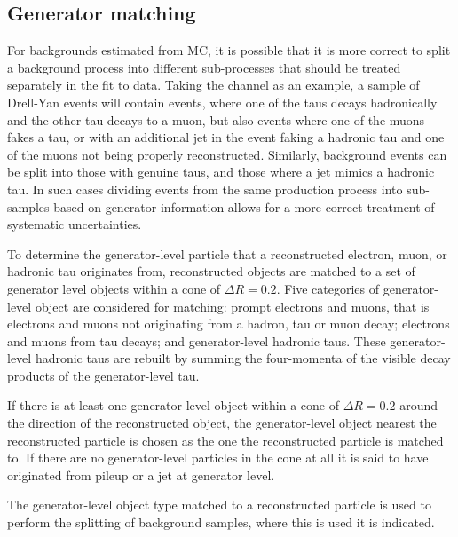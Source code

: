 \subsection{Generator matching}
\label{sec:mssm_bkgs_genmatch}
For backgrounds estimated from \ac{MC}, it is possible
that it is more correct to split a background process
into different sub-processes that should be treated separately in the fit to data.
Taking the \mutau 
channel as an example, a sample of Drell-Yan events
will contain \Ztautau events, where one of the taus decays
hadronically and the other tau decays to a muon, but also
\Zmm events where one of the muons fakes a tau, or with an 
additional jet in the event faking a hadronic tau and one of the
muons not being properly reconstructed. Similarly, \ttbar background
events can be split into those with genuine taus, and those
where a jet mimics a hadronic tau. In such cases dividing
events from the same production process into sub-samples
based on generator information allows for a more correct
treatment of systematic uncertainties.

To determine the generator-level particle
that a reconstructed electron, muon, or hadronic tau
originates from, reconstructed objects are matched
to a set of generator level objects within a cone of $\Delta R = 0.2$.
Five categories of generator-level object are considered for matching:
prompt electrons and muons,
that is electrons and muons not originating from a hadron, tau or muon decay; electrons and muons
from tau decays; and generator-level hadronic taus. These generator-level
hadronic taus are rebuilt by summing the four-momenta
of the visible decay products of the generator-level tau.

If there is at least one generator-level object
within a cone of $\Delta R = 0.2$ around the direction of the reconstructed
object, the generator-level object nearest the reconstructed particle is chosen
as the one the reconstructed particle is matched to. 
If there are no 
generator-level particles in the cone at all it is said to 
have originated from pileup or a jet at generator level.

The generator-level object type matched to a 
reconstructed particle is used to perform the splitting
of background samples, where this is used it is indicated.

